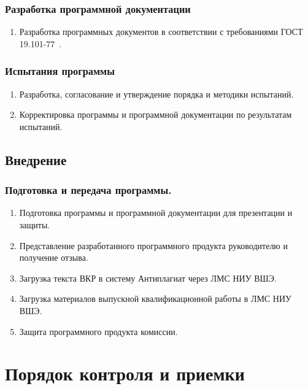 \documentclass[a4paper,12pt,reqno]{article}
\begin{document}
    \subsubsection{Разработка программной документации}
    \begin{enumerate}
        \item Разработка программных документов в соответствии с требованиями ГОСТ 19.101-77~\cite{TZ:gost0}.
    \end{enumerate}

    \subsubsection{Испытания программы}
    \begin{enumerate}
        \item Разработка, согласование и утверждение порядка и методики испытаний.
        \item Корректировка программы и программной документации по результатам испытаний.
    \end{enumerate}

    \subsection{Внедрение}

    \subsubsection{Подготовка и передача программы.}
    \begin{enumerate}
        \item Подготовка программы и программной документации для презентации и защиты.
        \item Представление разработанного программного продукта руководителю и получение отзыва.
        \item Загрузка текста ВКР в систему Антиплагиат через ЛМС НИУ ВШЭ.
        \item Загрузка материалов выпускной квалификационной работы в ЛМС НИУ ВШЭ.
        \item Защита программного продукта комиссии.
    \end{enumerate}
    \newpage


    \section{Порядок контроля и приемки}
\end{document}
